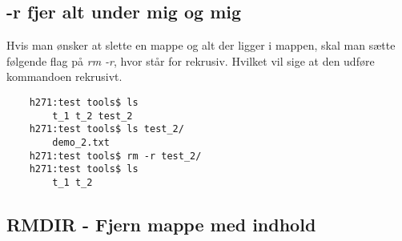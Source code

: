 \subsection*{-r fjer alt under mig og mig}
Hvis man ønsker at slette en mappe og alt der ligger i mappen, skal man sætte følgende flag på \textit{rm -r}, hvor  står for rekrusiv. Hvilket vil sige at den udføre kommandoen rekrusivt.
\begin{lstlisting}
	h271:test tools$ ls
        t_1	t_2	test_2
	h271:test tools$ ls test_2/
        demo_2.txt
	h271:test tools$ rm -r test_2/
	h271:test tools$ ls
        t_1	t_2
\end{lstlisting}
\subsection*{RMDIR - Fjern mappe med indhold}

